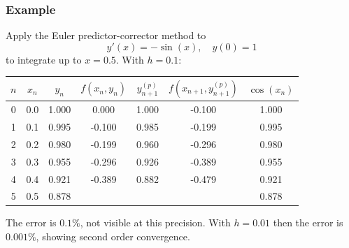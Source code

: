 \documentclass{beamer}
\begin{document}
\begin{frame}
  \frametitle{Example}


  Apply the Euler predictor-corrector method to
  \begin{equation*}
    y'(x) = - \sin(x), \quad y(0) = 1
  \end{equation*}
  to integrate up to $x = 0.5$. With $h = 0.1$:
  \begin{center}
    \begin{tabular}{c|c c c c c c}
      $n$ & $x_n$ & $y_n$ & $f(x_n, y_n)$ & $y_{n+1}^{(p)}$ & $f(x_{n+1},
      y_{n+1}^{(p)})$ & $\cos(x_n)$ \\
      \hline
      0 & 0.0 & 1.000 &  0.000 & 1.000 & -0.100 & 1.000 \\
      1 & 0.1 & 0.995 & -0.100 & 0.985 & -0.199 & 0.995 \\
      2 & 0.2 & 0.980 & -0.199 & 0.960 & -0.296 & 0.980 \\
      3 & 0.3 & 0.955 & -0.296 & 0.926 & -0.389 & 0.955 \\
      4 & 0.4 & 0.921 & -0.389 & 0.882 & -0.479 & 0.921 \\
      5 & 0.5 & 0.878 &        &       &        & 0.878
    \end{tabular}
  \end{center} \pause
  The error is $0.1\%$, not visible at this precision. With $h = 0.01$
  then the error is $0.001\%$, showing second order convergence.

\end{frame}
\end{document}
